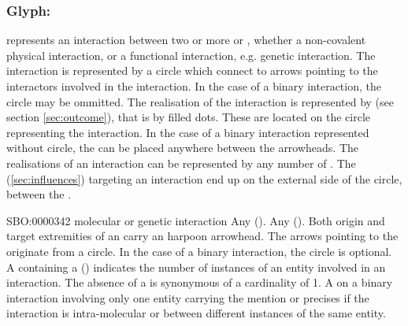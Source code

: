 
\subsubsection{Glyph: }\label{sec:interaction}

 represents an interaction between two or more  or , whether a non-covalent physical interaction, or a functional interaction, e.g. genetic interaction. The interaction is represented by a circle which connect to arrows pointing to the interactors involved in the interaction. In the case of a binary interaction, the circle may be ommitted. The realisation of the interaction is represented by  (see section \ref{sec:outcome}), that is by filled dots. These  are located on the circle representing the interaction. In the case of a binary interaction represented without circle, the  can be placed anywhere between the arrowheads. The realisations of an interaction can be represented by any number of . The  (\ref{sec:influences}) targeting an interaction end up on the external side of the circle, between the .

\begin{glyphDescription}
 \glyphSboTerm SBO:0000342 molecular or genetic interaction
 \glyphOrigin Any  ().
 \glyphTarget Any  ().
 \glyphEndPoint Both origin and target extremities of an  carry an harpoon arrowhead. The arrows pointing to the  originate from a circle. In the case of a binary interaction, the circle is optional. 
\glyphAux A  containing a  () indicates the number of instances of an entity involved in an interaction. The absence of a  is synonymous of a cardinality of 1. A  on a binary interaction involving only one entity carrying the mention  or  precises if the interaction is intra-molecular or between different instances of the same entity.
 \end{glyphDescription}

